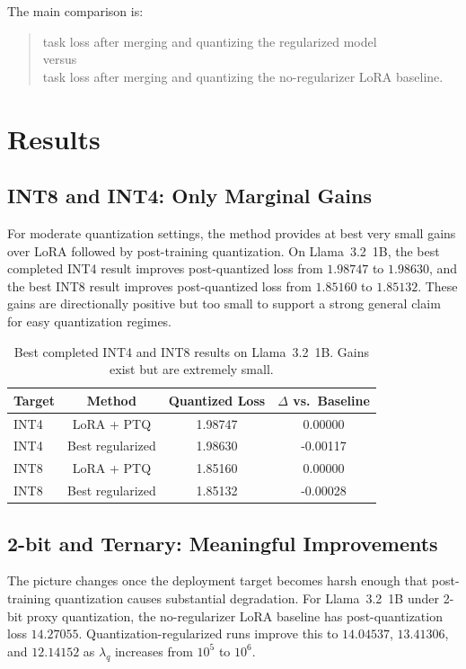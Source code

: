 \documentclass[11pt]{article}
\begin{document}
The main comparison is:
\begin{quote}
task loss after merging and quantizing the regularized model \\
versus \\
task loss after merging and quantizing the no-regularizer LoRA baseline.
\end{quote}

\section{Results}

\subsection{INT8 and INT4: Only Marginal Gains}

For moderate quantization settings, the method provides at best very small gains over LoRA followed by post-training quantization. On Llama~3.2~1B, the best completed INT4 result improves post-quantized loss from $1.98747$ to $1.98630$, and the best INT8 result improves post-quantized loss from $1.85160$ to $1.85132$. These gains are directionally positive but too small to support a strong general claim for easy quantization regimes.

\begin{table}[t]
\centering
\small
\begin{tabular}{lccc}
\toprule
Target & Method & Quantized Loss & $\Delta$ vs.\ Baseline \\
\midrule
INT4 & LoRA + PTQ & 1.98747 & 0.00000 \\
INT4 & Best regularized & 1.98630 & -0.00117 \\
INT8 & LoRA + PTQ & 1.85160 & 0.00000 \\
INT8 & Best regularized & 1.85132 & -0.00028 \\
\bottomrule
\end{tabular}
\caption{Best completed INT4 and INT8 results on Llama~3.2~1B. Gains exist but are extremely small.}
\label{tab:int4-int8}
\end{table}

\subsection{2-bit and Ternary: Meaningful Improvements}

The picture changes once the deployment target becomes harsh enough that post-training quantization causes substantial degradation. For Llama~3.2~1B under 2-bit proxy quantization, the no-regularizer LoRA baseline has post-quantization loss $14.27055$. Quantization-regularized runs improve this to $14.04537$, $13.41306$, and $12.14152$ as $\lambda_q$ increases from $10^5$ to $10^6$.
\end{document}
